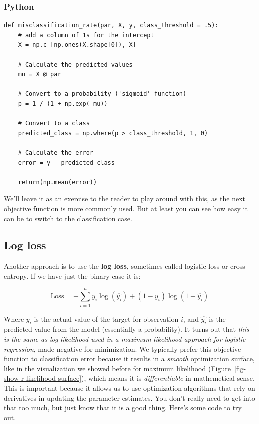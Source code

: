 \documentclass[
  letterpaper,
]{krantz}
\begin{document}
\subsubsection{Python}

\begin{verbatim}
def misclassification_rate(par, X, y, class_threshold = .5):
    # add a column of 1s for the intercept
    X = np.c_[np.ones(X.shape[0]), X]

    # Calculate the predicted values
    mu = X @ par
    
    # Convert to a probability ('sigmoid' function)
    p = 1 / (1 + np.exp(-mu))
    
    # Convert to a class
    predicted_class = np.where(p > class_threshold, 1, 0)
    
    # Calculate the error
    error = y - predicted_class 
    
    return(np.mean(error))
\end{verbatim}

We'll leave it as an exercise to the reader to play around with this, as
the next objective function is more commonly used. But at least you can
see how easy it can be to switch to the classification case.

\subsection{Log loss}\label{sec-estim-logloss}

Another approach is to use the \textbf{log loss}, sometimes called
logistic loss or cross-entropy. If we have just the binary case it is:

\[
\textrm{Loss} = -\sum_{i=1}^{n} y_i \log(\hat{y_i}) + (1 - y_i) \log(1 - \hat{y_i})
\]

Where \(y_i\) is the actual value of the target for observation \(i\),
and \(\hat{y_i}\) is the predicted value from the model (essentially a
probability). It turns out that \emph{this is the same as log-likelihood
used in a maximum likelihood approach for logistic regression}, made
negative for minimization. We typically prefer this objective function
to classification error because it results in a \emph{smooth}
optimization surface, like in the visualization we showed before for
maximum likelihood (Figure~\ref{fig-show-r-likelihood-surface}), which
means it is \emph{differentiable} in mathemetical sense. This is
important because it allows us to use optimization algorithms that rely
on derivatives in updating the parameter estimates. You don't really
need to get into that too much, but just know that it is a good thing.
Here's some code to try out.
\end{document}
